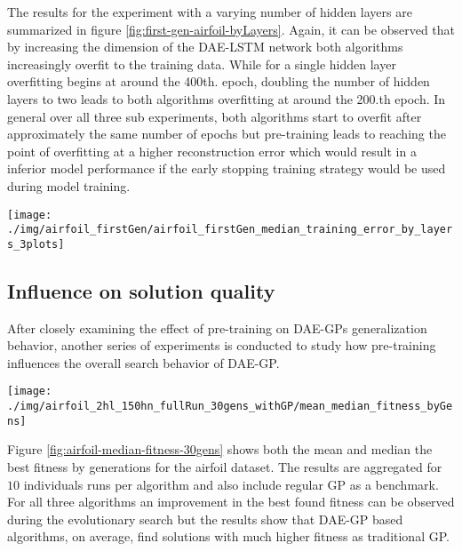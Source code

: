 \documentclass[
  11pt,
]{article}
\let\origfigure\figure
\let\endorigfigure\endfigure
\renewenvironment{figure}[1][2] {
    \expandafter\origfigure\expandafter[H]
} {
    \endorigfigure
}
\begin{document}
The results for the experiment with a varying number of hidden layers are summarized in figure \ref{fig:first-gen-airfoil-byLayers}.
Again, it can be observed that by increasing the dimension of the DAE-LSTM network both algorithms increasingly overfit to the training data.
While for a single hidden layer overfitting begins at around the 400th.
epoch, doubling the number of hidden layers to two leads to both algorithms overfitting at around the 200.th epoch.
In general over all three sub experiments, both algorithms start to overfit after approximately the same number of epochs but pre-training leads to reaching the point of overfitting at a higher reconstruction error which would result in a inferior model performance if the early stopping training strategy would be used during model training.

\begin{figure}[c]

{\centering \texttt{[image: ./img/airfoil\_firstGen/airfoil\_firstGen\_median\_training\_error\_by\_layers\_3plots]} 

}

\caption{First Generation Median Reconstruction Error for variable number of hidden Layers}\label{fig:first-gen-airfoil-byLayers}
\end{figure}

\hypertarget{influence-on-solution-quality}{%
\subsection{Influence on solution quality}\label{influence-on-solution-quality}}

After closely examining the effect of pre-training on DAE-GPs generalization behavior, another series of experiments is conducted to study how pre-training influences the overall search behavior of DAE-GP.

\begin{figure}[c]

{\centering \texttt{[image: ./img/airfoil\_2hl\_150hn\_fullRun\_30gens\_withGP/mean\_median\_fitness\_byGens]} 

}

\caption{Best Fitness over 30 Generations - Airfoil}\label{fig:airfoil-median-fitness-30gens}
\end{figure}

Figure \ref{fig:airfoil-median-fitness-30gens} shows both the mean and median the best fitness by generations for the airfoil dataset.
The results are aggregated for \(10\) individuals runs per algorithm and also include regular GP as a benchmark.
For all three algorithms an improvement in the best found fitness can be observed during the evolutionary search but the results show that DAE-GP based algorithms, on average, find solutions with much higher fitness as traditional GP.
\end{document}
